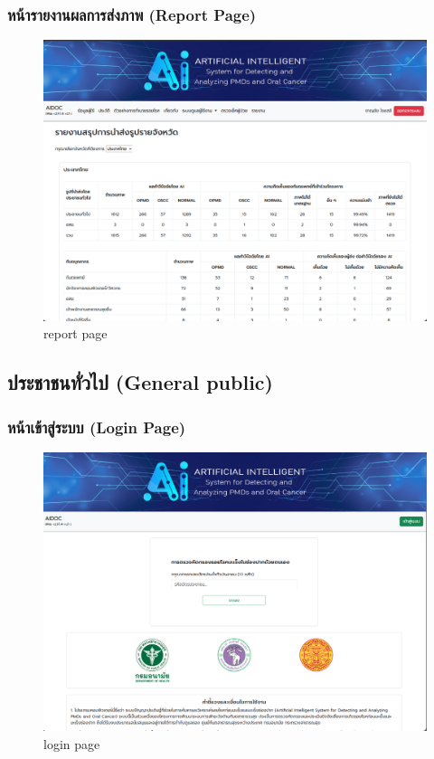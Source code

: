 \subsubsection{หน้ารายงานผลการส่งภาพ (Report Page)}

\begin{figure}[H]
  \centering
  \graphicspath{{./images/}}
  \includegraphics[scale=0.3]{report_user.png}
  \caption{report page}
  \label{fig:report_user}
\end{figure}

\subsection{ประชาชนทั่วไป (General public)}
\subsubsection{หน้าเข้าสู่ระบบ (Login Page)}
\begin{figure}[H]
  \centering
  \graphicspath{{./images/}}
  \includegraphics[scale=0.3]{login_patient.png}
  \caption{login page}
  \label{fig:login_patient}
\end{figure}

